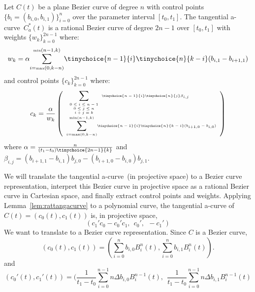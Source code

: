 \documentclass[12pt]{article}
\newcommand{\atang}{tangential a-curve\ }
\begin{document}
\begin{theorem}
\label{thm:Bezier}
Let $C(t)$ be a plane Bezier curve of degree $n$
with control points $\{ b_i = (b_{i,0}, b_{i,1}) \}_{i=0}^n$ 
over the parameter interval $[t_0,t_1]$.
The \atang $C_a^*(t)$ is a rational Bezier curve
of degree $2n-1$ over $[t_0,t_1]$ with weights $\{w_k\}_{k=0}^{2n-1}$ where: 
\begin{equation}
\label{eq:wt}
w_k = 	\alpha 
\displaystyle{\sum_{i=\mbox{\tiny{max}}(0,k-n)}^{\mbox{\tiny{min}}(n-1,k)}}
	\tinychoice{n-1}{i} \tinychoice{n}{k-i} (b_{i,1} - b_{i+1,1})
\end{equation}
%
and control points $\{c_k\}_{k=0}^{2n-1}$ where:
\begin{displaymath}
\tiny{
c_k = \frac{\alpha}{w_k} 
\left(
\begin{array}{l}
	\displaystyle{\sum_{\begin{array}{c} \mbox{\tiny{$0 \leq i \leq n-1$}} \\ 
		       \mbox{\tiny{$0 \leq j \leq n$}} \\ 
		       \mbox{\tiny{$i+j=k$}} \end{array}}}
	\tinychoice{n-1}{i} \tinychoice{n}{j} \beta_{i,j} \\
%	
	\displaystyle{\sum_{i=\mbox{\tiny{max}}(0,k-n)}^{\mbox{\tiny{min}}(n-1,k)}}
	\tinychoice{n-1}{i} \tinychoice{n}{k-i} (b_{i+1,0} - b_{i,0})
\end{array}
\right)
}
\end{displaymath}
where $\alpha = \tiny{\frac{n}{(t_1 - t_0) \tinychoice{2n-1}{k}}}$
and $\beta_{i,j} = (b_{i+1,1} - b_{i,1}) b_{j,0} - (b_{i+1,0} - b_{i,0}) b_{j,1}$.
\end{theorem}
%
%
\prf
We will translate the \atang (in projective space) to a Bezier curve representation,
interpret this Bezier curve in projective space
as a rational Bezier curve in Cartesian space,
and finally extract control points and weights.
Applying Lemma~\ref{lem:rattangacurve} to a polynomial curve,
the tangential a-curve of $C(t) = (c_0(t), c_1(t))$ is, in projective space,
\begin{equation}
\label{eq:dual2}
	(c_1'c_0 - c_0' c_1, \ \ c_0', \ \ -c_1')
\end{equation}
We want to translate to a Bezier curve representation.
Since $C$ is a Bezier curve,
\[
(c_0(t), c_1(t)) = (\sum_{i=0}^n b_{i,0} B_i^n(t), \sum_{i=0}^n b_{i,1} B_i^n(t)).
\]
and
\[
(c_0'(t), c_1'(t)) = (\frac{1}{t_1-t_0} \sum_{i=0}^{n-1}  n \Delta b_{i,0} B_i^{n-1}(t),\ \ 
		      \frac{1}{t_1-t_0} \sum_{i=0}^{n-1}  n \Delta b_{i,1} B_i^{n-1}(t)
\]
\end{document}
